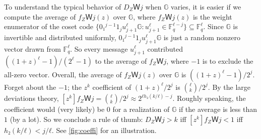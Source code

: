 \documentclass[openany]{amsbook}
\numberwithin{equation}{chapter}
\numberwithin{figure}{chapter}
\numberwithin{table}{chapter}
\theoremstyle{definition}	理dfn:Definition~?s			理exa:Example~?s
\theoremstyle{remark}		理cla:Claim~?s				理rem:Remark~?s
\begin{document}
	To understand the typical behavior of $D_ZＷj$ when $𝔾$ varies,
	it is easier if we compute the average of $f_ZＷj(z)$ over $𝔾$,
	where $f_ZＷj(z)$ is the weight enumerator of the coset code
	$\{0₁^{j-1}1_ju_{j+1}^ℓ𝔾:u_{j+1}^ℓ∈𝔽_q^{ℓ-j}\}⊆𝔽_q^ℓ$.
	Since $𝔾$ is invertible and distributed uniformly,
	$0₁^{j-1}1_ju_{j+1}^ℓ𝔾$ is just a random nonzero vector drawn from $𝔽_q^ℓ$.
	So every message $u_{j+1}^ℓ$ contributed $((1+z)^ℓ-1)/(2^ℓ-1)$
	to the average of $f_ZＷj$, where $-1$ is to exclude the all-zero vector.
	Overall, the average of $f_ZＷj(z)$ over $𝔾$ is $((1+z)^ℓ-1)/2^j$.
	Forget about the $-1$;
	the $z^k$ coefficient of $(1+z)^ℓ/2^j$ is $\binom{ℓ}k/2^j$.
	By the large deviations theory, $[z^k]f_ZＷj=\binom{ℓ}k/2^j≈2^{ℓh₂(k/ℓ)-j}$.
	Roughly speaking, the coefficient would (very likely) be $0$
	for a realization of $𝔾$ if the average is less than $1$ (by a lot).
	So we conclude a rule of thumb:
	$D_ZＷj>k$ iff $[z^k]f_ZＷj<1$ iff $h₂(k/ℓ)<j/ℓ$.
	See \cref{fig:coeffi} for an illustration.
	
\end{document}
